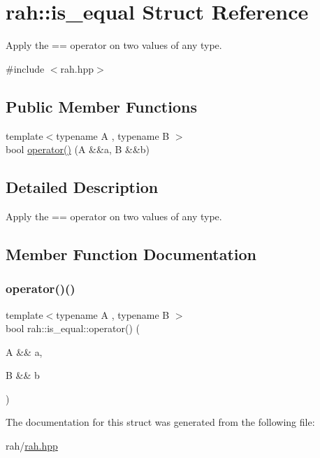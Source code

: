 \hypertarget{structrah_1_1is__equal}{}\section{rah\+::is\+\_\+equal Struct Reference}
\label{structrah_1_1is__equal}


Apply the \textquotesingle{}==\textquotesingle{} operator on two values of any type.  




{\ttfamily \#include $<$rah.\+hpp$>$}

\subsection*{Public Member Functions}
\begin{DoxyCompactItemize}
\item 
{\footnotesize template$<$typename A , typename B $>$ }\\bool \mbox{\hyperlink{structrah_1_1is__equal_a0b24ed08028993dd652bcdc7c1414745}{operator()}} (A \&\&a, B \&\&b)
\end{DoxyCompactItemize}


\subsection{Detailed Description}
Apply the \textquotesingle{}==\textquotesingle{} operator on two values of any type. 

\subsection{Member Function Documentation}
\mbox{\label{structrah_1_1is__equal_a0b24ed08028993dd652bcdc7c1414745}} 
\subsubsection{\texorpdfstring{operator()()}{operator()()}}
{\footnotesize\ttfamily template$<$typename A , typename B $>$ \\
bool rah\+::is\+\_\+equal\+::operator() (\begin{DoxyParamCaption}\item[{A \&\&}]{a,  }\item[{B \&\&}]{b }\end{DoxyParamCaption})\hspace{0.3cm}{\ttfamily [inline]}}



The documentation for this struct was generated from the following file\+:\begin{DoxyCompactItemize}
\item 
rah/\mbox{\hyperlink{rah_8hpp}{rah.\+hpp}}\end{DoxyCompactItemize}
